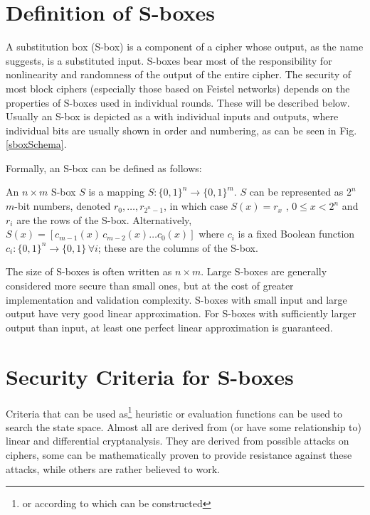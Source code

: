 %
%
%
%
%
%
%
%
\section{Definition of S-boxes}
A substitution box (S-box) is a component of a cipher whose output, as the name suggests,
is a substituted input. S-boxes bear most of the responsibility for nonlinearity
and randomness of the output of the entire cipher. The security of most block ciphers (especially those based on Feistel networks)
depends on the properties of S-boxes used in individual rounds. These will be described below.
Usually an S-box is depicted as a  with individual inputs and outputs, where
individual bits are usually shown in order and numbering, as can be seen in Fig. \ref{sboxSchema}.


Formally, an S-box can be defined as follows:
\begin{definition}\cite{practicalSboxDesign}
An $n \times m$ S-box $S$ is a mapping $S: \{0,1\}^n \rightarrow \{0,1\}^m$.
$S$ can be represented as $2^n$ $m$-bit numbers, denoted $r_0, \dots, r_{2^n-1}$,
in which case $S(x) = r_x$ , $0 \leq x < 2^n$ and $r_i$ are the rows
of the S-box. Alternatively, $S(x) = \left[ c_{m−1}(x) \, c_{m−2}(x) \dots c_{0}(x) \right] $
where $c_i$ is a fixed Boolean function $c_i : \{0,1\}^n \rightarrow \{0,1\} \, \forall i$;
these are the columns of the S-box.
\label{defSbox}
\end{definition}
The size of S-boxes is often written as $n \times m$.
Large S-boxes \cite{bigSboxes} are generally considered more secure
than small ones, but at the cost of greater implementation and validation complexity.
S-boxes with small input and large output have very good linear approximation.
For S-boxes with sufficiently larger output than input, at least one
perfect linear approximation is guaranteed.

\section{Security Criteria for S-boxes}\label{secCriterions}
Criteria that can be used as\footnote{or according to which can be constructed}
heuristic or evaluation functions can be used to search the state space.
Almost all are derived from (or have some relationship to)
linear and differential cryptanalysis.
They are derived from possible attacks on ciphers, some can be mathematically proven to provide resistance against
these attacks, while others are rather believed to work.


